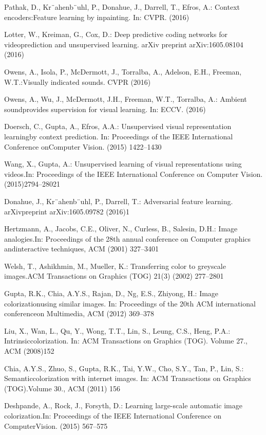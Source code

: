 \begin{translationbib}
\item Pathak, D., Kr¨ahenb¨uhl, P., Donahue, J., Darrell, T., Efros, A.: Context encoders:Feature learning by inpainting. In: CVPR. (2016)
\item Lotter, W., Kreiman, G., Cox, D.: Deep predictive coding networks for videoprediction and unsupervised learning. arXiv preprint arXiv:1605.08104 (2016)
\item Owens, A., Isola, P., McDermott, J., Torralba, A., Adelson, E.H., Freeman, W.T.:Visually indicated sounds. CVPR (2016)
\item Owens, A., Wu, J., McDermott, J.H., Freeman, W.T., Torralba, A.: Ambient soundprovides supervision for visual learning. In: ECCV. (2016)
\item Doersch, C., Gupta, A., Efros, A.A.: Unsupervised visual representation learningby context prediction. In: Proceedings of the IEEE International Conference onComputer Vision. (2015) 1422–1430
\item Wang, X., Gupta, A.: Unsupervised learning of visual representations using videos.In: Proceedings of the IEEE International Conference on Computer Vision. (2015)2794–28021
\item Donahue, J., Kr¨ahenb¨uhl, P., Darrell, T.: Adversarial feature learning. arXivpreprint arXiv:1605.09782 (2016)1
\item Hertzmann, A., Jacobs, C.E., Oliver, N., Curless, B., Salesin, D.H.: Image analogies.In: Proceedings of the 28th annual conference on Computer graphics andinteractive techniques, ACM (2001) 327–3401
\item Welsh, T., Ashikhmin, M., Mueller, K.: Transferring color to greyscale images.ACM Transactions on Graphics (TOG) 21(3) (2002) 277–2801
\item Gupta, R.K., Chia, A.Y.S., Rajan, D., Ng, E.S., Zhiyong, H.: Image colorizationusing similar images. In: Proceedings of the 20th ACM international conferenceon Multimedia, ACM (2012) 369–378
\item Liu, X., Wan, L., Qu, Y., Wong, T.T., Lin, S., Leung, C.S., Heng, P.A.: Intrinsiccolorization. In: ACM Transactions on Graphics (TOG). Volume 27., ACM (2008)152
\item Chia, A.Y.S., Zhuo, S., Gupta, R.K., Tai, Y.W., Cho, S.Y., Tan, P., Lin, S.: Semanticcolorization with internet images. In: ACM Transactions on Graphics (TOG).Volume 30., ACM (2011) 156
\item Deshpande, A., Rock, J., Forsyth, D.: Learning large-scale automatic image colorization.In: Proceedings of the IEEE International Conference on ComputerVision. (2015) 567–575

\end{translationbib}
